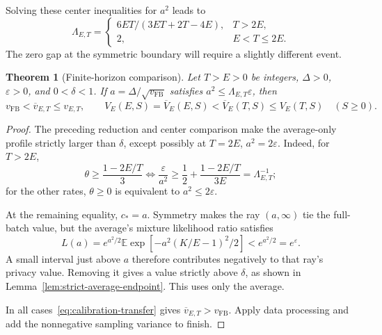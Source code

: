 \documentclass[11pt]{article}
\newtheorem{theorem}{Theorem}[section]
\theoremstyle{remark}
\newcommand{\E}{\mathbb E}
\begin{document}
Solving these center inequalities for $a^2$ leads to
\begin{equation}\label{eq:rate-adaptive-signal-factor}
 \Lambda_{E,T}=
 \begin{cases}6ET/(3ET+2T-4E),&T>2E,\\2,&E<T\leq2E.\end{cases}
\end{equation}
The zero gap at the symmetric boundary will require a slightly different event.

\begin{theorem}[Finite-horizon comparison]\label{thm:rate-adaptive-pointwise}
Let $T>E>0$ be integers, $\Delta>0$, $\varepsilon>0$, and $0<\delta<1$.
If $a=\Delta/\sqrt{v_{\mathrm{FB}}}$ satisfies
$a^2\leq\Lambda_{E,T}\varepsilon$, then
\[
 v_{\mathrm{FB}}<\overline v_{E,T}\leq v_{E,T},\qquad
 V_E(E,S)=\overline V_E(E,S)<\overline V_E(T,S)\leq V_E(T,S)
 \quad(S\geq0).
\]
\end{theorem}
\begin{proof}
The preceding reduction and center comparison make the average-only profile
strictly larger than $\delta$, except possibly at $T=2E$, $a^2=2\varepsilon$.
Indeed, for $T>2E$,
\[
 \theta\geq\frac{1-2E/T}{3}
 \iff\frac{\varepsilon}{a^2}\geq\frac12+\frac{1-2E/T}{3E}
 =\Lambda_{E,T}^{-1};
\]
for the other rates, $\theta\geq0$ is equivalent to $a^2\leq2\varepsilon$.

At the remaining equality, $c_*=a$. Symmetry makes the ray $(a,\infty)$
tie the full-batch value, but the average's mixture likelihood ratio satisfies
\[
 L(a)=e^{a^2/2}\E\exp[-a^2(K/E-1)^2/2]<e^{a^2/2}=e^\varepsilon.
\]
A small interval just above $a$ therefore contributes negatively to that ray's
privacy value. Removing it gives a value strictly above $\delta$, as shown
in Lemma~\ref{lem:strict-average-endpoint}. This uses only the average.

In all cases~\eqref{eq:calibration-transfer} gives
$\overline v_{E,T}>v_{\mathrm{FB}}$. Apply data processing and add the
nonnegative sampling variance to finish.
\end{proof}
\end{document}
